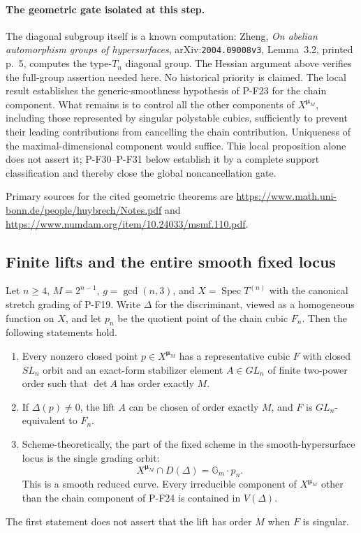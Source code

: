 \paragraph{The geometric gate isolated at this step.}
The diagonal subgroup itself is a known computation:
Zheng, \emph{On abelian automorphism groups of hypersurfaces},
arXiv:\texttt{2004.09008v3}, Lemma~3.2, printed p.~5,
computes the type-$T_n$ diagonal group. The Hessian argument
above verifies the full-group assertion needed here.
No historical priority is claimed. The local result establishes
the generic-smoothness hypothesis of P-F23 for the chain component.
What remains is to control all the other components of
$X^{\boldsymbol\mu_M}$, including those represented by
singular polystable cubics, sufficiently to prevent their
leading contributions from cancelling the chain contribution.
Uniqueness of the maximal-dimensional component would suffice.
This local proposition alone does not assert it; P-F30--P-F31
below establish it by a complete support classification and
thereby close the global noncancellation gate.

Primary sources for the cited geometric theorems are
\url{https://www.math.uni-bonn.de/people/huybrech/Notes.pdf}
and \url{https://www.numdam.org/item/10.24033/msmf.110.pdf}.



\subsection{Finite lifts and the entire smooth fixed locus}

\begin{proposition}
\label{prop:finitecubiclift}
Let $n\ge4$, $M=2^{n-1}$, $g=\gcd(n,3)$, and
$X=\operatorname{Spec}T^{(n)}$ with the canonical stretch grading
of P-F19. Write $\Delta$ for the discriminant, viewed as a
homogeneous function on $X$, and let $p_n$ be the quotient point
of the chain cubic $F_n$. Then the following statements hold.

\begin{enumerate}
\item Every nonzero closed point $p\in X^{\boldsymbol\mu_M}$
has a representative cubic $F$ with closed $SL_n$ orbit and an
exact-form stabilizer element $A\in GL_n$ of finite two-power
order such that $\det A$ has order exactly $M$.
\item If $\Delta(p)\ne0$, the lift $A$ can be chosen of order
exactly $M$, and $F$ is $GL_n$-equivalent to $F_n$.
\item Scheme-theoretically, the part of the fixed scheme in
the smooth-hypersurface locus is the single grading orbit:
\[
 X^{\boldsymbol\mu_M}\cap D(\Delta)
      =\mathbb G_m\cdot p_n.
 \tag{P-F26a}
\]
This is a smooth reduced curve. Every irreducible component of
$X^{\boldsymbol\mu_M}$ other than the chain component of P-F24
is contained in $V(\Delta)$.
\end{enumerate}
The first statement does not assert that the lift has order $M$
when $F$ is singular.
\end{proposition}


